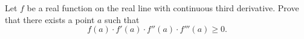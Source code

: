 Let $f$ be a real function on the real line with continuous third
derivative.  Prove that there exists a point $a$ such that
\[f(a)\cdot f'(a) \cdot f''(a) \cdot f'''(a)\geq 0 .\]
